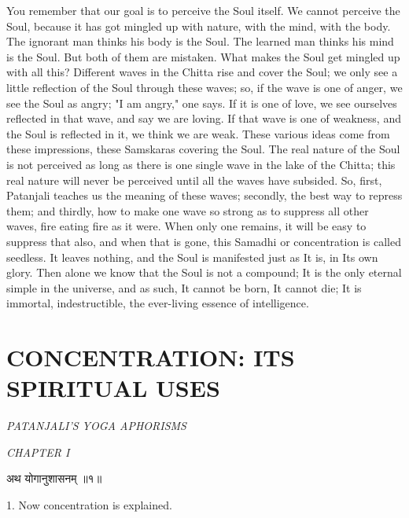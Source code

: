 You remember that our goal is to perceive the Soul itself. We
cannot perceive the Soul, because it has got mingled up with nature,
with the mind, with the body. The ignorant man thinks his body is the
Soul. The learned man thinks his mind is the Soul. But both of them are
mistaken. What makes the Soul get mingled up with all this? Different
waves in the Chitta rise and cover the Soul; we only see a little
reflection of the Soul through these waves; so, if the wave is one of
anger, we see the Soul as angry; "I am angry," one says. If it is one
of love, we see ourselves reflected in that wave, and say we are
loving. If that wave is one of weakness, and the Soul is reflected in
it, we think we are weak. These various ideas come from these
impressions, these Samskaras covering the Soul. The real nature of the
Soul is not perceived as long as there is one single wave in the lake
of the Chitta; this real nature will never be perceived until all the
waves have subsided. So, first, Patanjali teaches us the meaning of
these waves; secondly, the best way to repress them; and thirdly, how
to make one wave so strong as to suppress all other waves, fire eating
fire as it were. When only one remains, it will be easy to suppress
that also, and when that is gone, this Samadhi or concentration is
called seedless. It leaves nothing, and the Soul is manifested just as
It is, in Its own glory. Then alone we know that the Soul is not a
compound; It is the only eternal simple in the universe, and as such,
It cannot be born, It cannot die; It is immortal, indestructible, the
ever-living essence of intelligence. \\

\section{CONCENTRATION: ITS SPIRITUAL USES }
\begin{center}\textit{PATANJALI'S YOGA APHORISMS}\end{center}

\begin{center}\textit{CHAPTER I}\end{center}

\begin{center}
\begin{sanskrit}
अथ योगानुशासनम् ॥१॥
\end{sanskrit}
\end{center}
1. Now concentration is explained. \\

